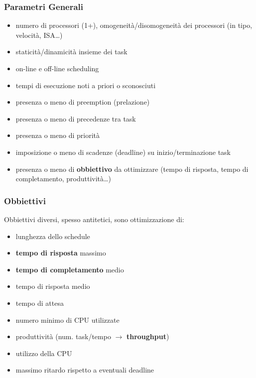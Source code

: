 \documentclass{article}
\begin{document}
\subsubsection{Parametri Generali}
\begin{itemize}
    \item numero di processori (1+), omogeneità/disomogeneità dei processori (in tipo, velocità, ISA…)
    \item staticità/dinamicità insieme dei task
    \item on-line e off-line scheduling
    \item  tempi di esecuzione noti a priori o sconosciuti
    \item presenza o meno di preemption (prelazione)
    \item presenza o meno di precedenze tra task
    \item presenza o meno di priorità
    \item imposizione o meno di scadenze (deadline) su inizio/terminazione task
    \item presenza o meno di \textbf{obbiettivo} da ottimizzare (tempo di risposta, tempo di completamento, produttività…)
\end{itemize}
\subsubsection{Obbiettivi}
Obbiettivi diversi, spesso antitetici, sono ottimizzazione di:
\begin{itemize}
    \item lunghezza dello schedule
    \item \textbf{tempo di risposta} massimo
    \item \textbf{tempo di completamento} medio
    \item tempo di risposta medio
    \item tempo di attesa
    \item numero minimo di CPU utilizzate
    \item produttività (num. task/tempo $\rightarrow$ \textbf{throughput})
    \item utilizzo della CPU
    \item massimo ritardo rispetto a eventuali deadline
\end{itemize}
\end{document}
